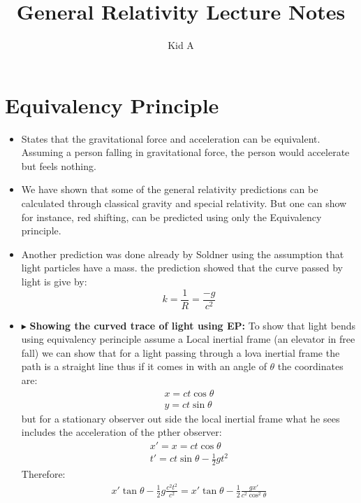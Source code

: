 \documentclass[10pt,a4paper]{article}
\title{General Relativity Lecture Notes}
\author{Kid A}
\newcommand{\newpoint}[1]{\indent$\blacktriangleright$ \textbf{#1}}
\begin{document}
\maketitle
     \section{Equivalency Principle}
     \begin{itemize}
          \item States that the gravitational force and acceleration can be equivalent. Assuming a person falling in gravitational force, the person would accelerate but feels nothing.
          \item We have shown that some of the general relativity predictions can be calculated through classical gravity and special relativity. But one can show for instance, red shifting, can be predicted using only the Equivalency principle.
          \item Another prediction was done already by Soldner using the assumption that light particles have a mass. the prediction showed that the curve passed by light is give by:
          \begin{equation}
               k = \frac 1R = \frac{-g}{c^2}
          \end{equation}
          \item \newpoint{Showing the curved trace of light using EP:} To show that light bends using equivalency perinciple assume a Local inertial frame (an elevator in free fall) we can show that for a light passing through a lova inertial frame the path is a straight line thus if it comes in with an angle of $\theta$ the coordinates are:
          \begin{align}
               x= ct\cos\theta \\
               y= ct\sin\theta
          \end{align}
          but for a stationary observer out side the local inertial frame what he sees includes the acceleration of the pther observer:
          \begin{align}
               x' = x = ct\cos\theta\\
               t' = ct\sin\theta - \frac12 g  t^2
          \end{align}
          Therefore:
          \begin{align}
               x'\tan\theta - \frac12 g\frac{c^2t^2}{c^2} = x'\tan\theta-\frac12 \frac{gx'}{c^2\cos^2\theta}
          \end{align}

\end{itemize}
\end{document}
